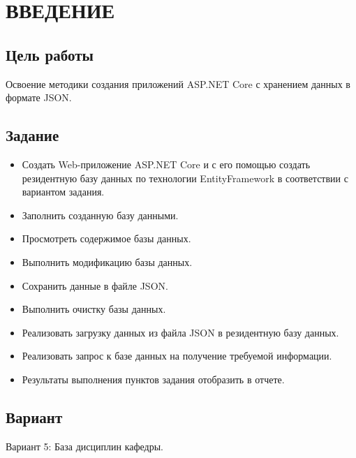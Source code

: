 \chapter{ВВЕДЕНИЕ}

\section{Цель работы}
Освоение методики создания приложений ASP.NET Core с хранением данных в формате JSON.

\section{Задание}

\begin{itemize}
	\item Создать Web-приложение ASP.NET Core и с его помощью создать резидентную базу данных по технологии EntityFramework в соответствии с вариантом задания.
	\item Заполнить созданную базу данными.
	\item Просмотреть содержимое базы данных.
	\item Выполнить модификацию базы данных.
	\item Сохранить данные в файле JSON.
	\item Выполнить очистку базы данных.
	\item Реализовать загрузку данных из файла JSON в резидентную базу данных.
	\item Реализовать запрос к базе данных на получение требуемой информации.
	\item Результаты выполнения пунктов задания отобразить в отчете.
\end{itemize}

\section{Вариант}
Вариант 5: База дисциплин кафедры.